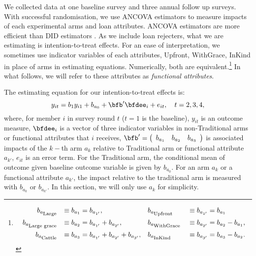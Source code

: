 	We collected data at one baseline survey and three annual follow up surveys. With successful randomisation, we use ANCOVA estimators to measure impacts of each experimental arms and loan attributes. ANCOVA estimators are more efficient than DID estimators \citep{FrisonPocock1992, McKenzie2012}. As we include loan rejecters, what we are estimating is intention-to-treat effects. For an ease of interpretation, we sometimes use indicator variables of each attributes, \textsf{Upfront, WithGrace, InKind} in place of arms in estimating equations. Numerically, both are equivalent.\footnote{
\[
\begin{aligned}
b_{a_{\mbox{\scriptsize Large}}}&&\equiv b_{a_{1}}&=b_{a_{1'}}, \quad &&b_{a_{\mbox{\scriptsize Upfront}}}&&\equiv b_{a_{1'}}=b_{a_{1}}\\
b_{a_{\mbox{\scriptsize Large grace}}}&&\equiv b_{a_{2}}&=b_{a_{1'}}+b_{a_{2'}}, &&b_{a_{\mbox{\scriptsize WithGrace}}}&&\equiv b_{a_{2'}}=b_{a_{2}}-b_{a_{1}},\\
b_{a_{\mbox{\scriptsize Cattle}}}&&\equiv b_{a_{3}}&=b_{a_{1'}}+b_{a_{2'}}+b_{a_{3'}}, &&b_{a_{\mbox{\scriptsize InKind}}}&&\equiv b_{a_{3'}}=b_{a_{3}}-b_{a_{2}}.
\end{aligned}
\] } In what follows, we will refer to these attributes as \textit{functional attributes}.

	The estimating equation for our intention-to-treat effects is:
	\begin{equation}
	y_{it}=b_{1}y_{i1}+b_{a_{0}}+\bfb'\bfdee_{i}+e_{it}, \quad t=2, 3, 4,
	\label{1steq}
	\end{equation}
	where, for member $i$ in survey round $t$ ($t=1$ is the baseline), $y_{it}$ is an outcome measure, $\bfdee_{i}$ is a vector of three indicator variables in non-\textsf{Traditional} arms or functional attributes that $i$ receives, $\bfb'=\left(
	\begin{array}{ccc}
	b_{a_{1}} & b_{a_{2}} & b_{a_{3}}
	\end{array}
	\right)$ is associated impacts of the $k-$th arm $a_{k}$ relative to \textsf{Traditional} arm or functional attribute $a_{k'}$, $e_{it}$ is an error term. For the \textsf{Traditional} arm, the conditional mean of outcome given baseline outcome variable is given by $b_{a_{0}}$. For an arm $a_{k}$ or a functional attribute $a_{k'}$, the impact relative to the traditional arm is measured with $b_{a_{k}}$ or $b_{a_{k'}}$. In this section, we will only use $a_{k}$ for simplicity.

